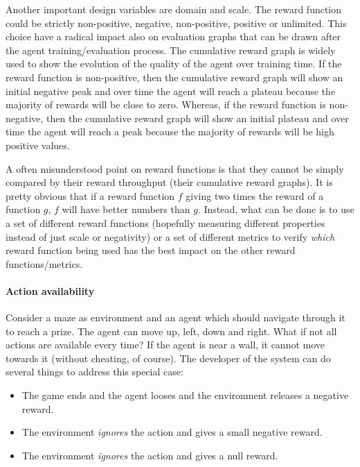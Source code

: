 Another important design variables are domain and scale.
The reward function could be strictly non-positive, negative, non-positive, positive or unlimited.
This choice have a radical impact also on evaluation graphs that can be drawn after the agent training/evaluation process.
The cumulative reward graph is widely used to show the evolution of the quality of the agent over training time.
If the reward function is non-positive, then the cumulative reward graph will show an initial negative peak and over time the agent will reach a plateau because the majority of rewards will be close to zero.
Whereas, if the reward function is non-negative, then the cumulative reward graph will show an initial plateau and over time the agent will reach a peak because the majority of rewards will be high positive values.

A often misunderstood point on reward functions is that they cannot be simply compared by their reward throughput (their cumulative reward graphs).
It is pretty obvious that if a reward function $f$ giving two times the reward of a function $g$, $f$ will have better numbers than $g$.
Instead, what can be done is to use a set of different reward functions (hopefully measuring different properties instead of just scale or negativity) or a set of different metrics to verify \textit{which} reward function being used has the best impact on the other reward functions/metrics.

\paragraph{Action availability}

Consider a maze as environment and an agent which should navigate through it to reach a prize. The agent can move up, left, down and right.
What if not all actions are available every time? If the agent is near a wall, it cannot move towards it (without cheating, of course).
The developer of the system can do several things to address this special case:

\begin{itemize}
  \item The game ends and the agent looses and the environment releases a negative reward.
  \item The environment \textit{ignores} the action and gives a small negative reward.
  \item The environment \textit{ignores} the action and gives a null reward.
\end{itemize}

